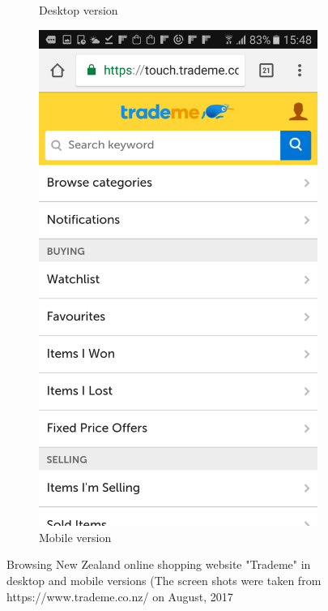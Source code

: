 \begin{figure}[!hbt]
\begin{subfigure}{0.25\textwidth}
 \caption{Desktop version}
    \end{subfigure}\hspace{0.1\textwidth}
    \begin{subfigure}{0.25\textwidth}
\includegraphics[width=\textwidth]{cha2}
  \caption{Mobile version}
    \end{subfigure}
    \caption{Browsing New Zealand online shopping website "Trademe" in desktop and mobile versions (The screen shots were taken from https://www.trademe.co.nz/ on August, 2017}
\end{figure}

